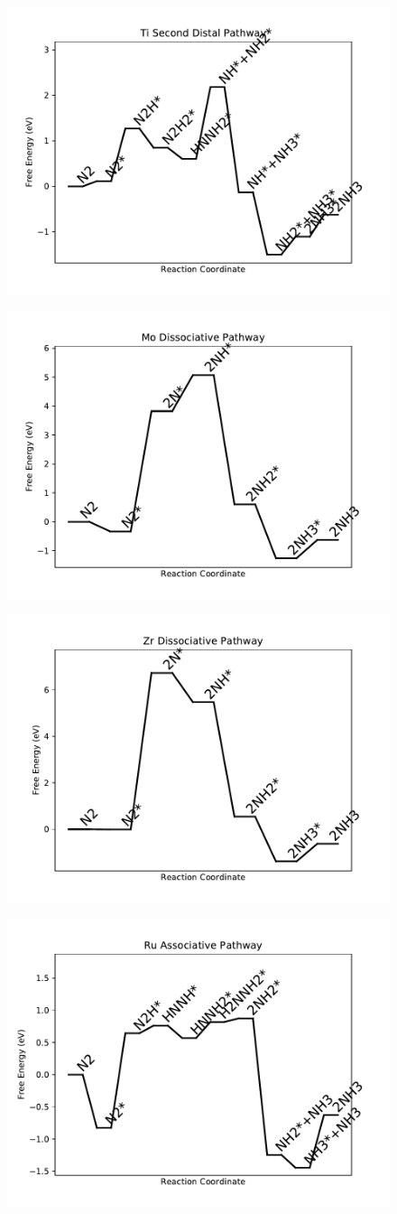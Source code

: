 \documentclass[journal=jacsat,manuscript=article]{achemso}
\begin{document}
\begin{figure}
\includegraphics[width=0.5\linewidth]{data/plots/Ti_distal_2.pdf}
\label{fig:Ti_distal_2}
\end{figure}

\newpage
\begin{figure}
\includegraphics[width=0.5\linewidth]{data/plots/Mo_dissociative.pdf}
\label{fig:Mo_dissociative}
\end{figure}

\begin{figure}
\includegraphics[width=0.5\linewidth]{data/plots/Zr_dissociative.pdf}
\label{fig:Zr_dissociative}
\end{figure}

\newpage
\begin{figure}
\includegraphics[width=0.5\linewidth]{data/plots/Ru_associative.pdf}
\label{fig:Ru_associative}
\end{figure}
\end{document}
